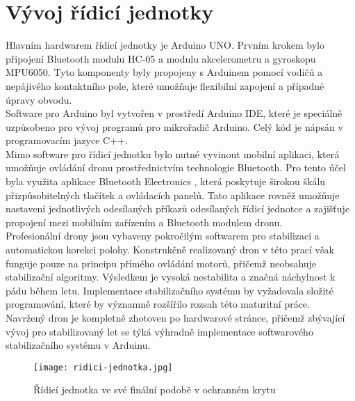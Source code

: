 \documentclass[12pt]{report}
\begin{document}
\chapter[Vývoj řídicí jednotky]{Vývoj řídicí jednotky}
Hlavním hardwarem řídicí jednotky je Arduino UNO. Prvním krokem bylo připojení Bluetooth modulu HC-05 a modulu akcelerometru a gyroskopu MPU6050. Tyto komponenty byly propojeny s Arduinem pomocí vodičů a nepájivého kontaktního pole, které umožňuje flexibilní zapojení a případné úpravy obvodu.\\
Software pro Arduino byl vytvořen v prostředí Arduino IDE, které je speciálně uzpůsobeno pro vývoj programů pro mikrořadič Arduino. Celý kód je nápsán v programovacím jazyce C++.\\
Mimo software pro řídicí jednotku bylo nutné vyvinout mobilní aplikaci, která umožňuje ovládání dronu prostřednictvím technologie Bluetooth. Pro tento účel byla využita aplikace Bluetooth Electronics \cite{be}, která poskytuje širokou škálu přizpůsobitelných tlačítek a ovládacích panelů. Tato aplikace rovněž umožňuje nastavení jednotlivých odesílaných příkazů odesílaných řídicí jednotce a zajišťuje propojení mezi mobilním zařízením a Bluetooth modulem dronu.\\
Profesionální drony jsou vybaveny pokročilým softwarem pro stabilizaci a automatickou korekci polohy. Konstrukčně realizovaný dron v této prací však funguje pouze na principu přímého ovládání motorů, přičemž neobsahuje stabilizační algoritmy. Výsledkem je vysoká nestabilita a značná náchylnost k pádu během letu. Implementace stabilizačního systému by vyžadovala složité programování, které by významně rozšířilo rozsah této maturitní práce.\\
Navržený dron je kompletně zhotoven po hardwarové stránce, přičemž zbývající vývoj pro stabilizovaný let se týká výhradně implementace softwarového stabilizačního systému v Arduinu.
\begin{figure}[H]
	\centering
	\texttt{[image: ridici-jednotka.jpg]}
	\caption{Řídicí jednotka ve své finální podobě v ochranném krytu}
	\label{fig:ridici-jednotka.jpg}
\end{figure}
\end{document}
